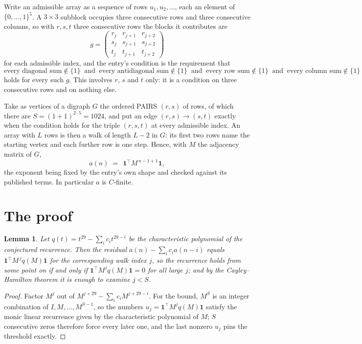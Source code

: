 \documentclass[11pt,a4paper]{article}
\theoremstyle{plain}
\newtheorem{lemma}[theorem]{Lemma}
\theoremstyle{definition}
\begin{document}
Write an admissible array as a sequence of rows $u_1,u_2,\dots$, each an element of
$\{0,\dots,1\}^{5}$. A $3\times3$ subblock occupies three consecutive rows and
three consecutive columns, so with $r,s,t$ three consecutive rows the blocks it
contributes are
\[
g=\begin{pmatrix}r_j&r_{j+1}&r_{j+2}\\ s_j&s_{j+1}&s_{j+2}\\ t_j&t_{j+1}&t_{j+2}\end{pmatrix}
\]
for each admissible index, and the entry's condition is the requirement that
\[
\text{every diagonal sum} \notin \{1\}\ \text{ and }\ \text{every antidiagonal sum} \notin \{1\}\ \text{ and }\ \text{every row sum} \notin \{1\}\ \text{ and }\ \text{every column sum} \notin \{1\}
\]
holds for every such $g$. This involves $r$, $s$ and $t$ only: it is a condition on
three consecutive rows and on nothing else.

Take as vertices of a digraph $G$ the ordered PAIRS $(r,s)$ of rows, of which there are
$S=(1+1)^{2\cdot5}=1024$, and put an edge $(r,s)\to(s,t)$ exactly when the condition
holds for the triple $(r,s,t)$ at every admissible index. An array with $L$ rows is then a
walk of length $L-2$ in $G$: its first two rows name the starting vertex and each further
row is one step. Hence, with $M$ the adjacency matrix of $G$,
\[
a(n)\;=\;\,\mathbf{1}^{\!\top}M^{\,n-1+1}\mathbf{1},
\]
the exponent being fixed by the entry's own shape and checked against its published terms.
In particular $a$ is $C$-finite.

\section{The proof}

\begin{lemma}\label{lem:crit}
Let $q(t)=t^{29}-\sum_i c_it^{29-i}$ be the characteristic polynomial of the
conjectured recurrence. Then the residual $a(n)-\sum_ic_ia(n-i)$ equals
$\mathbf{1}^{\!\top}M^{\,j}q(M)\mathbf{1}$ for the corresponding walk index
$j$, so the recurrence holds from some point on if and only if
$\mathbf{1}^{\!\top}M^{j}q(M)\mathbf{1}=0$ for all large $j$; and by the
Cayley--Hamilton theorem it is enough to examine $j<S$.
\end{lemma}

\begin{proof}
Factor $M^{j}$ out of $M^{j+29}-\sum_ic_iM^{j+29-i}$. For the bound, $M^{S}$
is an integer combination of $I,M,\dots,M^{S-1}$, so the numbers
$u_j=\mathbf{1}^{\!\top}M^{j}q(M)\mathbf{1}$ satisfy the monic linear recurrence given by
the characteristic polynomial of $M$; $S$ consecutive zeros therefore force every later one,
and the last nonzero $u_j$ pins the threshold exactly.
\end{proof}
\end{document}
